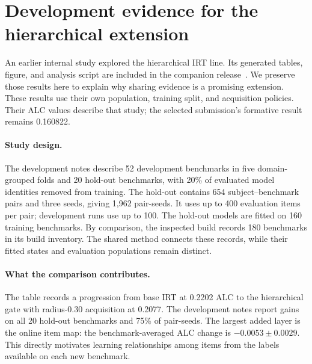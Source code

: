 \section{Development evidence for the hierarchical extension}
\label{app:shared}
An earlier internal study explored the hierarchical IRT line. Its generated tables, figure, and analysis script are included in the companion release~\citep{release}. We preserve those results here to explain why sharing evidence is a promising extension. These results use their own population, training split, and acquisition policies. Their ALC values describe that study; the selected submission's formative result remains 0.160822.

\paragraph{Study design.}
The development notes describe 52 development benchmarks in five domain-grouped folds and 20 hold-out benchmarks, with 20\% of evaluated model identities removed from training. The hold-out contains 654 subject--benchmark pairs and three seeds, giving 1,962 pair-seeds. It uses up to 400 evaluation items per pair; development runs use up to 100. The hold-out models are fitted on 160 training benchmarks. By comparison, the inspected  build records 180 benchmarks in its build inventory. The shared method connects these records, while their fitted states and evaluation populations remain distinct.

\begin{table}[H]
\centering
\caption{Preserved hierarchical development results from the committed main-result table. Dev and hold-out use different item caps. ALC columns reproduce the stored aggregate metrics. The last column first averages paired differences within each benchmark, then reports the mean and 95\% normal interval across 20 benchmarks. Consequently, it can differ from subtraction of the displayed ALC means. Bold identifies the selected hierarchical configuration in that study.}
\label{tab:shared-results}
\small
\setlength{\tabcolsep}{3pt}

\end{table}

\paragraph{What the comparison contributes.}
The table records a progression from base IRT at 0.2202 ALC to the hierarchical gate with radius-0.30 acquisition at 0.2077. The development notes report gains on all 20 hold-out benchmarks and 75\% of pair-seeds. The largest added layer is the online item map: the benchmark-averaged ALC change is $-0.0053\pm0.0029$. This directly motivates learning relationships among items from the labels available on each new benchmark.


